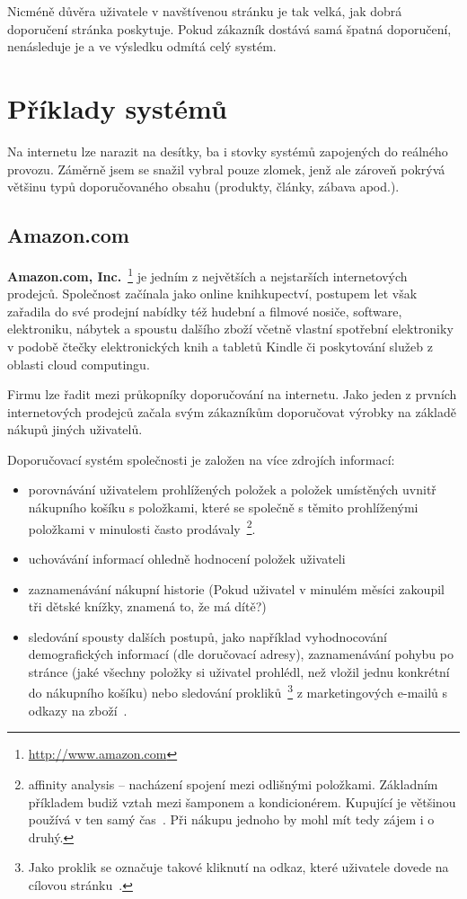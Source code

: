 \documentclass[thesis=M,czech]{FITthesis}[2014/05/07]
\begin{document}
Nicméně důvěra uživatele v navštívenou stránku je tak velká, jak dobrá doporučení stránka poskytuje. Pokud zákazník dostává samá špatná doporučení, nenásleduje je a ve výsledku odmítá celý systém.

\section{Příklady systémů}
\label{sec:examples}
Na internetu lze narazit na desítky, ba i stovky systémů zapojených do reálného provozu. Záměrně jsem se snažil vybral pouze zlomek, jenž ale zároveň pokrývá většinu typů doporučovaného obsahu (produkty, články, zábava apod.).

\subsection{Amazon.com}

\textbf{Amazon.com, Inc.}~\footnote{\url{http://www.amazon.com}} je jedním z největších a nejstarších internetových prodejců. Společnost začínala jako online knihkupectví, postupem let však zařadila do své prodejní nabídky též hudební a filmové nosiče, software, elektroniku, nábytek a spoustu dalšího zboží včetně vlastní spotřební elektroniky v podobě čtečky elektronických knih a tabletů Kindle či poskytování služeb z oblasti cloud computingu.

Firmu lze řadit mezi průkopníky doporučování na internetu. Jako jeden z prvních internetových prodejců začala svým zákazníkům doporučovat výrobky na základě nákupů jiných uživatelů.

Doporučovací systém společnosti je založen na více zdrojích informací:

\begin{itemize}
	\item porovnávání uživatelem prohlížených položek a položek umístěných uvnitř nákupního košíku s položkami, které se společně s těmito prohlíženými položkami v minulosti často prodávaly~\footnote{affinity analysis – nacházení spojení mezi odlišnými položkami. Základním příkladem budiž vztah mezi šamponem a kondicionérem. Kupující je většinou používá v ten samý čas~\cite{affinity}. Při nákupu jednoho by mohl mít tedy zájem i o druhý.}.
	\item uchovávání informací ohledně hodnocení položek uživateli
	\item zaznamenávání nákupní historie (Pokud uživatel v minulém měsíci zakoupil tři dětské knížky, znamená to, že má dítě?)
	\item sledování spousty dalších postupů, jako například vyhodnocování demografických informací (dle doručovací adresy), zaznamenávání pohybu po stránce (jaké všechny položky si uživatel prohlédl, než vložil jednu konkrétní do nákupního košíku) nebo sledování prokliků~\footnote{Jako proklik se označuje takové kliknutí na odkaz, které uživatele dovede na cílovou stránku~\cite{proklik}.} z marketingových e-mailů s odkazy na zboží~\cite{amazonrec}.
\end{itemize}
\end{document}
